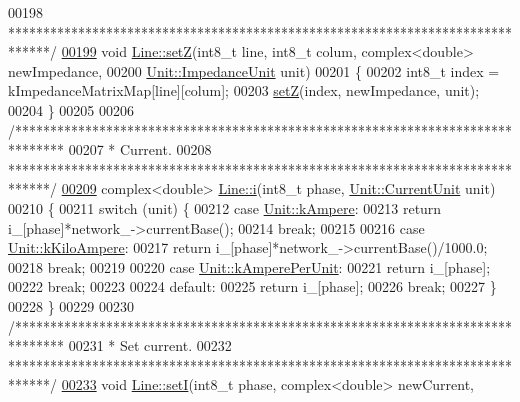 \begin{DoxyCode}
00198 \textcolor{comment}{ ******************************************************************************/}
\hypertarget{line_8cpp_source_l00199}{}\hyperlink{group___models_ga0c6767e389e4ee26932b6f22ca8f89f5}{00199} \textcolor{keywordtype}{void} \hyperlink{group___models_ga2b8fe47ae4ae2d4422d9431e17b4927d}{Line::setZ}(int8\_t line, int8\_t colum, complex<double> newImpedance,
00200                 \hyperlink{class_unit_a3747e779c805df24a71961290be3fbdf}{Unit::ImpedanceUnit} unit)
00201 \{
00202   int8\_t index = kImpedanceMatrixMap[line][colum];
00203   \hyperlink{group___models_ga2b8fe47ae4ae2d4422d9431e17b4927d}{setZ}(index, newImpedance, unit);
00204 \}
00205 
00206 \textcolor{comment}{/*******************************************************************************}
00207 \textcolor{comment}{ * Current.}
00208 \textcolor{comment}{ ******************************************************************************/}
\hypertarget{line_8cpp_source_l00209}{}\hyperlink{group___models_ga2ad899adaa4f2e25b38c58e076db94ea}{00209} complex<double> \hyperlink{group___models_ga2ad899adaa4f2e25b38c58e076db94ea}{Line::i}(int8\_t phase, \hyperlink{class_unit_a0794cf6c9682f48296dd4a5315389787}{Unit::CurrentUnit} unit)
00210 \{
00211   \textcolor{keywordflow}{switch} (unit) \{
00212   \textcolor{keywordflow}{case} \hyperlink{class_unit_a0794cf6c9682f48296dd4a5315389787a368a3c470f0b590a6100dda717a7dd4f}{Unit::kAmpere}:
00213     \textcolor{keywordflow}{return} i\_[phase]*network\_->currentBase();
00214     \textcolor{keywordflow}{break};
00215 
00216   \textcolor{keywordflow}{case} \hyperlink{class_unit_a0794cf6c9682f48296dd4a5315389787aa27cb5edd73099f24f2285e02396ae14}{Unit::kKiloAmpere}:
00217     \textcolor{keywordflow}{return} i\_[phase]*network\_->currentBase()/1000.0;
00218     \textcolor{keywordflow}{break};
00219 
00220   \textcolor{keywordflow}{case} \hyperlink{class_unit_a0794cf6c9682f48296dd4a5315389787aeed3b50e464d581cb630181a3b6a0709}{Unit::kAmperePerUnit}:
00221     \textcolor{keywordflow}{return} i\_[phase];
00222     \textcolor{keywordflow}{break};
00223 
00224   \textcolor{keywordflow}{default}:
00225     \textcolor{keywordflow}{return} i\_[phase];
00226     \textcolor{keywordflow}{break};
00227   \}
00228 \}
00229 
00230 \textcolor{comment}{/*******************************************************************************}
00231 \textcolor{comment}{ * Set current.}
00232 \textcolor{comment}{ ******************************************************************************/}
\hypertarget{line_8cpp_source_l00233}{}\hyperlink{group___models_gab01ecad45ee9d81a33b9f5806533066c}{00233} \textcolor{keywordtype}{void} \hyperlink{group___models_gab01ecad45ee9d81a33b9f5806533066c}{Line::setI}(int8\_t phase, complex<double> newCurrent,

\end{DoxyCode}
